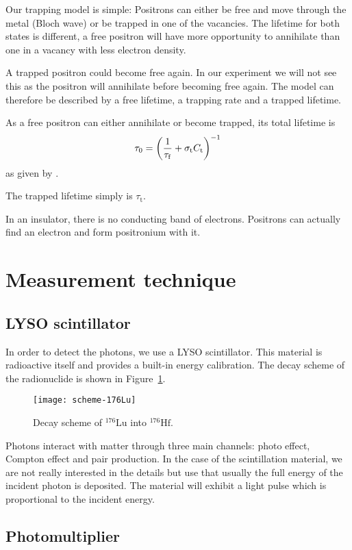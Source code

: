 \documentclass[11pt, english, fleqn, DIV=15, headinclude, BCOR=2cm]{scrreprt}
\begin{document}
Our trapping model is simple: Positrons can either be free and move through the
metal (Bloch wave) or be trapped in one of the vacancies. The lifetime for both
states is different, a free positron will have more opportunity to annihilate
than one in a vacancy with less electron density.

A trapped positron could become free again. In our experiment we will not see
this as the positron will annihilate before becoming free again. The model can
therefore be described by a free lifetime, a trapping rate and a trapped
lifetime.

As a free positron can either annihilate or become trapped, its total lifetime
is
\[
    \tau_0 = \left( \frac{1}{\tau_\mathrm f} + \sigma_\mathrm t C_\mathrm t \right)^{-1}
\]
as given by \textcite[(1a)]{Weiler/Vacancy_formation}.

The trapped lifetime simply is $\tau_\mathrm t$.

In an insulator, there is no conducting band of electrons. Positrons can
actually find an electron and form positronium with it. 

\section{Measurement technique}

\subsection{LYSO scintillator}

In order to detect the photons, we use a LYSO scintillator. This material is
radioactive itself and provides a built-in energy calibration. The decay scheme
of the radionuclide is shown in Figure~\ref{fig:scheme-176Lu}.

\begin{figure}
    \centering
    \texttt{[image: scheme-176Lu]}
    \caption{%
        Decay scheme of $^{176}\mathrm{Lu}$ into $^{176}\mathrm{Hf}$.
    }
    \label{fig:scheme-176Lu}
\end{figure}

Photons interact with matter through three main channels: photo effect, Compton
effect and pair production. In the case of the scintillation material, we are
not really interested in the details but use that usually the full energy of
the incident photon is deposited. The material will exhibit a light pulse which
is proportional to the incident energy.

\subsection{Photomultiplier}
\end{document}
